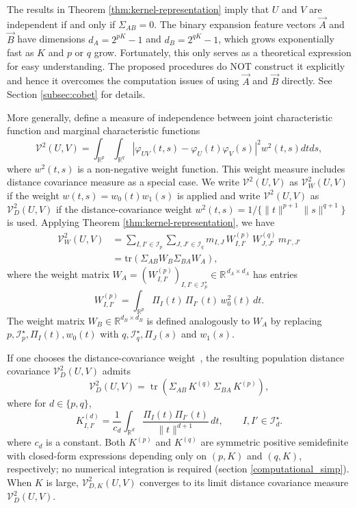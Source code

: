 \documentclass[12pt,reqno,oneside]{amsbook}
\theoremstyle{definition}
\theoremstyle{remark}
\begin{document}
The results in Theorem \ref{thm:kernel-representation} imply that 
$U$ and $V$ are independent if and only if $\Sigma_{AB}=0$.
The binary expansion feature vectors $\vec A$ and $\vec B$ have dimensions $d_A=2^{pK}-1$
and $d_B=2^{qK}-1$, which grows exponentially fast as $K$ and $p$ or $q$ grow. 
Fortunately, this only serves as a theoretical expression for easy understanding. 
The proposed procedures do NOT construct it explicitly and hence it overcomes the computation issues of using $\vec A$ and $\vec B$ directly. See Section \ref{subsec:cobet} for details.

More generally, define a measure of independence between joint characteristic function and marginal characteristic functions 
\[
\mathcal V^2(U,V)
=\int_{\mathbb R^p}\int_{\mathbb R^q} |\varphi_{UV}(t,s)-\varphi_U(t)\varphi_V(s)|^2w^2(t,s)dtds,
\]
where $w^2(t,s)$ is a non-negative weight function. This weight measure includes
distance covariance measure as a special case. 
We write $\mathcal V^2(U,V)$ as $\mathcal V_W^2(U,V)$ if the weight $w(t,s)=w_0(t)w_1(s)$ is applied and
write $\mathcal V^2(U,V)$ as $\mathcal V_D^2(U,V)$ if 
the distance-covariance weight $w^2(t,s)=1/\{\|t\|^{p+1}\|s\|^{q+1}\}$ \cite{Szekely2007} is used. 
Applying Theorem \ref{thm:kernel-representation}, 
we have
\begin{align*}
\mathcal V_W^2(U,V)&=\sum_{I,I'\in\mathcal I_p}\sum_{J,J'\in\mathcal I_q}
m_{I,J}\,W^{(p)}_{I,I'}\,W^{(q)}_{J,J'}\,m_{I',J'}\\
&=\mbox{tr}(\Sigma_{AB}W_B\Sigma_{BA}W_A),
\end{align*}
where the weight matrix
$
W_A=(W^{(p)}_{I,I'})_{I,I'\in\mathcal I_p^\star}
\in\mathbb R^{\,d_A\times d_A}
$
has entries
\[
W^{(p)}_{I,I'}
=
\int_{\mathbb R^p}
\Pi_I(t)\,\Pi_{I'}(t)\,w_0^2(t)\,dt.
\]
The weight matrix $W_B\in\mathbb R^{d_B\times d_B}$ is defined analogously to $W_A$ by replacing
$p,\mathcal I_p^\star,\Pi_I(t), w_0(t)$ with $q,\mathcal I_q^\star,\Pi_J(s)$ and $w_1(s)$.

If one chooses the distance-covariance weight~\cite{Szekely2007}, the resulting
population distance covariance $\mathcal V_D^2(U,V)$ admits
\[
\mathcal V_D^2(U,V)
=
\operatorname{tr}\!\left(
\Sigma_{AB}\,K^{(q)}\,\Sigma_{BA}\,K^{(p)}
\right),
\]
where for $d\in\{p,q\}$,
\[
K^{(d)}_{I,I'}
=
\frac{1}{c_d}
\int_{\mathbb R^d}
\frac{\Pi_I(t)\Pi_{I'}(t)}{\|t\|^{d+1}}\,dt,
\qquad
I,I'\in\mathcal I_d^\star.
\]
where $c_d$ is a constant. Both $K^{(p)}$ and $K^{(q)}$ are symmetric positive semidefinite with closed-form expressions depending only on $(p,K)$ and $(q,K)$, respectively; no numerical integration is required (section \ref{computational_simp}). When $K$ is large, $\mathcal V_{D,K}^2(U,V)$ converges to its
limit distance covariance measure $\mathcal V_{D}^2(U,V)$.
\end{document}
